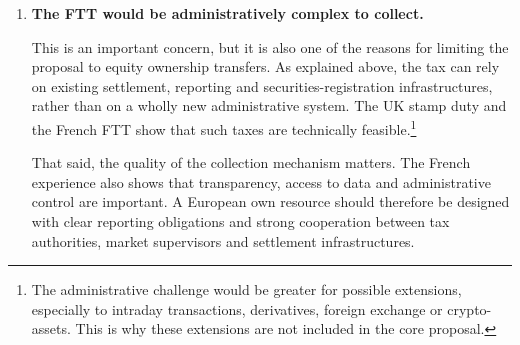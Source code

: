 \documentclass[../../main]{subfiles}
\begin{document}
\begin{enumerate}
    \item \textbf{The FTT would be administratively complex to collect.}

This is an important concern, but it is also one of the reasons for limiting the proposal to equity ownership transfers. As explained above, the tax can rely on existing settlement, reporting and securities-registration infrastructures, rather than on a wholly new administrative system. The UK stamp duty and the French FTT show that such taxes are technically feasible.\footnote{The administrative challenge would be greater for possible extensions, especially to intraday transactions, derivatives, foreign exchange or crypto-assets. This is why these extensions are not included in the core proposal.}

    That said, the quality of the collection mechanism matters. The French experience also shows that transparency, access to data and administrative control are important. A European own resource should therefore be designed with clear reporting obligations and strong cooperation between tax authorities, market supervisors and settlement infrastructures.







\end{enumerate}
\end{document}
